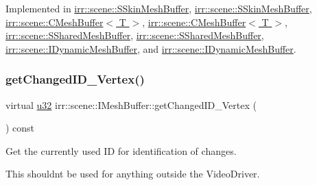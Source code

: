 Implemented in \hyperlink{structirr_1_1scene_1_1SSkinMeshBuffer_a60b444cfe4b0cec6d2cc4bdf7958dd16}{irr\+::scene\+::\+S\+Skin\+Mesh\+Buffer}, \hyperlink{structirr_1_1scene_1_1SSkinMeshBuffer_a60b444cfe4b0cec6d2cc4bdf7958dd16}{irr\+::scene\+::\+S\+Skin\+Mesh\+Buffer}, \hyperlink{classirr_1_1scene_1_1CMeshBuffer_aec6786022abd81ddf8d4e79a23628944}{irr\+::scene\+::\+C\+Mesh\+Buffer$<$ T $>$}, \hyperlink{classirr_1_1scene_1_1CMeshBuffer_aec6786022abd81ddf8d4e79a23628944}{irr\+::scene\+::\+C\+Mesh\+Buffer$<$ T $>$}, \hyperlink{structirr_1_1scene_1_1SSharedMeshBuffer_a0a37d52f7ec9917d9ca0d9dd908917b9}{irr\+::scene\+::\+S\+Shared\+Mesh\+Buffer}, \hyperlink{structirr_1_1scene_1_1SSharedMeshBuffer_a0a37d52f7ec9917d9ca0d9dd908917b9}{irr\+::scene\+::\+S\+Shared\+Mesh\+Buffer}, \hyperlink{classirr_1_1scene_1_1IDynamicMeshBuffer_a2514a3d0e4865b7b9714fe1f9f58ad51}{irr\+::scene\+::\+I\+Dynamic\+Mesh\+Buffer}, and \hyperlink{classirr_1_1scene_1_1IDynamicMeshBuffer_a2514a3d0e4865b7b9714fe1f9f58ad51}{irr\+::scene\+::\+I\+Dynamic\+Mesh\+Buffer}.

\mbox{\label{classirr_1_1scene_1_1IMeshBuffer_aba48df31edf92a0117692c0be02298db}} 
\subsubsection{\texorpdfstring{get\+Changed\+I\+D\+\_\+\+Vertex()}{getChangedID\_Vertex()}\hspace{0.1cm}{\footnotesize\ttfamily [1/2]}}
{\footnotesize\ttfamily virtual \hyperlink{namespaceirr_a0416a53257075833e7002efd0a18e804}{u32} irr\+::scene\+::\+I\+Mesh\+Buffer\+::get\+Changed\+I\+D\+\_\+\+Vertex (\begin{DoxyParamCaption}{ }\end{DoxyParamCaption}) const\hspace{0.3cm}{\ttfamily [pure virtual]}}



Get the currently used ID for identification of changes. 

This shouldn\textquotesingle{}t be used for anything outside the Video\+Driver. 

